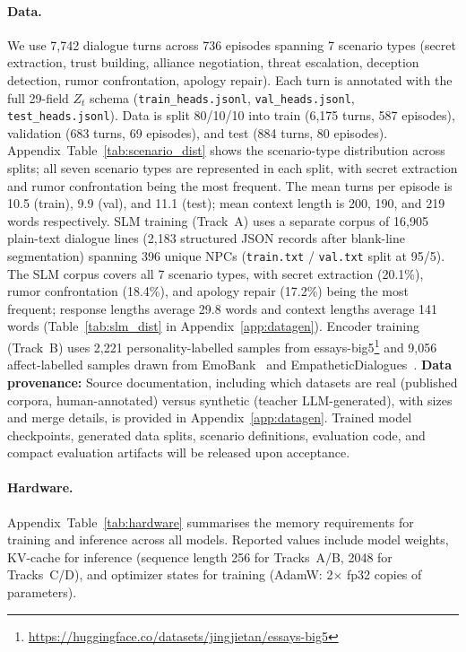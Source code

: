 \documentclass[11pt]{article}
\begin{document}
\paragraph{Data.}
We use 7,742 dialogue turns across 736 episodes spanning 7 scenario types (secret extraction, trust building, alliance negotiation, threat escalation, deception detection, rumor confrontation, apology repair).
Each turn is annotated with the full 29-field $Z_t$ schema (\texttt{train\_heads.jsonl}, \texttt{val\_heads.jsonl}, \texttt{test\_heads.jsonl}).
Data is split 80/10/10 into train (6,175 turns, 587 episodes), validation (683 turns, 69 episodes), and test (884 turns, 80 episodes).
Appendix~Table~\ref{tab:scenario_dist} shows the scenario-type distribution across splits; all seven scenario types are represented in each split, with secret extraction and rumor confrontation being the most frequent.
The mean turns per episode is 10.5 (train), 9.9 (val), and 11.1 (test); mean context length is 200, 190, and 219 words respectively.
SLM training (Track~A) uses a separate corpus of 16,905 plain-text dialogue lines (2,183 structured JSON records after blank-line segmentation) spanning 396 unique NPCs (\texttt{train.txt} / \texttt{val.txt} split at 95/5).
The SLM corpus covers all 7 scenario types, with secret extraction (20.1\%), rumor confrontation (18.4\%), and apology repair (17.2\%) being the most frequent; response lengths average 29.8 words and context lengths average 141 words (Table~\ref{tab:slm_dist} in Appendix~\ref{app:datagen}).
Encoder training (Track~B) uses 2,221 personality-labelled samples from essays-big5\footnote{\url{https://huggingface.co/datasets/jingjietan/essays-big5}} and 9,056 affect-labelled samples drawn from EmoBank~\cite{buechel2017emobank} and EmpatheticDialogues~\cite{rashkin2019empathetic}.
\textbf{Data provenance:} Source documentation, including which datasets are real (published corpora, human-annotated) versus synthetic (teacher LLM-generated), with sizes and merge details, is provided in Appendix~\ref{app:datagen}.
Trained model checkpoints, generated data splits, scenario definitions, evaluation code, and compact evaluation artifacts will be released upon acceptance.

\paragraph{Hardware.}
Appendix~Table~\ref{tab:hardware} summarises the memory requirements for training and inference across all models.
Reported values include model weights, KV-cache for inference (sequence length 256 for Tracks~A/B, 2048 for Tracks~C/D), and optimizer states for training (AdamW: 2$\times$ fp32 copies of parameters).
\end{document}
